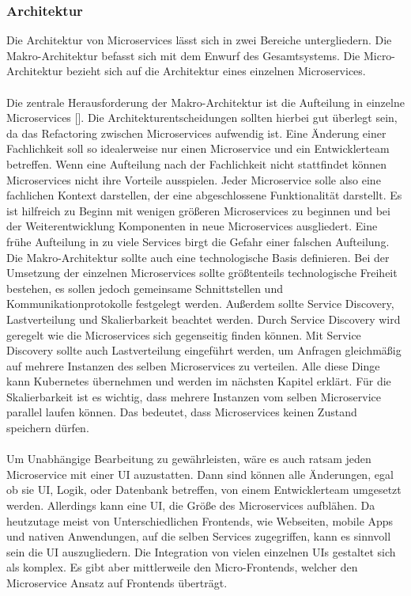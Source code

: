 \subsubsection{Architektur}

Die Architektur von Microservices lässt sich in zwei Bereiche untergliedern. Die Makro-Architektur befasst sich mit dem Enwurf des Gesamtsystems. Die Micro-Architektur bezieht sich auf die Architektur eines einzelnen Microservices. \\
\\
Die zentrale Herausforderung der Makro-Architektur ist die Aufteilung in einzelne Microservices [\cite[S. 102]{wolffMicroservices2018}]. Die Architekturentscheidungen sollten hierbei gut überlegt sein, da das Refactoring zwischen Microservices aufwendig ist. Eine Änderung einer Fachlichkeit soll so idealerweise nur einen Microservice und ein Entwicklerteam betreffen. Wenn eine Aufteilung nach der Fachlichkeit nicht stattfindet können Microservices nicht ihre Vorteile ausspielen. Jeder Microservice solle also eine fachlichen Kontext darstellen, der eine abgeschlossene Funktionalität darstellt. Es ist hilfreich zu Beginn mit wenigen größeren Microservices zu beginnen und bei der Weiterentwicklung Komponenten in neue Microservices ausgliedert. Eine frühe Aufteilung in zu viele Services birgt die Gefahr einer falschen Aufteilung. Die Makro-Architektur sollte auch eine technologische Basis definieren. Bei der Umsetzung der einzelnen Microservices sollte größtenteils technologische Freiheit bestehen, es sollen jedoch gemeinsame Schnittstellen und Kommunikationprotokolle festgelegt werden. Außerdem sollte Service Discovery, Lastverteilung und Skalierbarkeit beachtet werden. Durch Service Discovery wird geregelt wie die Microservices sich gegenseitig finden können. Mit Service Discovery sollte auch Lastverteilung eingeführt werden, um Anfragen gleichmäßig auf mehrere Instanzen des selben Microservices zu verteilen. Alle diese Dinge kann Kubernetes übernehmen und werden im nächsten Kapitel erklärt. Für die Skalierbarkeit ist es wichtig, dass mehrere Instanzen vom selben Microservice parallel laufen können. Das bedeutet, dass Microservices keinen Zustand speichern dürfen. \\
\\
Um Unabhängige Bearbeitung zu gewährleisten, wäre es auch ratsam jeden Microservice mit einer UI auzustatten. Dann sind können alle Änderungen, egal ob sie UI, Logik, oder Datenbank betreffen, von einem Entwicklerteam umgesetzt werden. Allerdings kann eine UI, die Größe des Microservices aufblähen. Da heutzutage meist von Unterschiedlichen Frontends, wie Webseiten, mobile Apps und nativen Anwendungen, auf die selben Services zugegriffen, kann es sinnvoll sein die UI auszugliedern. Die Integration von vielen einzelnen UIs gestaltet sich als komplex. Es gibt aber mittlerweile den Micro-Frontends, welcher den Microservice Ansatz auf Frontends überträgt.  \\
